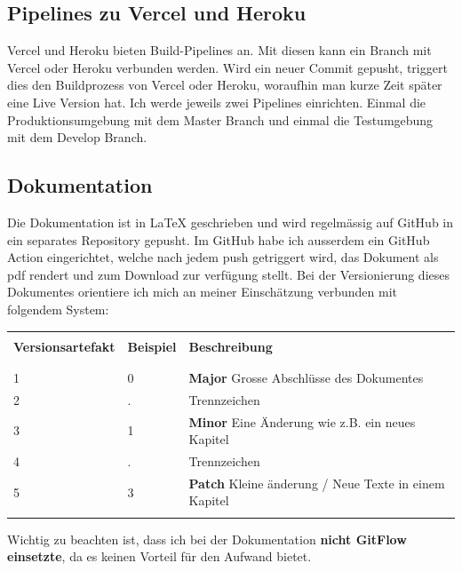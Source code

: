 \subsection{Pipelines zu Vercel und Heroku}
Vercel und Heroku bieten Build-Pipelines an. Mit diesen kann ein Branch mit Vercel oder Heroku verbunden werden. Wird ein neuer Commit gepusht, triggert dies den Buildprozess von Vercel oder Heroku, woraufhin man kurze Zeit später eine Live Version hat.
\newline
\newline
Ich werde jeweils zwei Pipelines einrichten. Einmal die Produktionsumgebung mit dem Master Branch und einmal die Testumgebung mit dem Develop Branch.
\subsection{Dokumentation}
Die Dokumentation ist in LaTeX geschrieben und wird regelmässig auf GitHub in ein separates Repository gepusht. Im GitHub habe ich ausserdem ein GitHub Action eingerichtet, welche nach jedem push getriggert wird, das Dokument als pdf rendert und zum Download zur verfügung stellt.
\newline
\newline
Bei der Versionierung dieses Dokumentes orientiere ich mich an meiner Einschätzung verbunden mit folgendem System:
\begin{table}[htp]
  \begin{tabularx}{\textwidth}{l l X}\hline \\
  \textbf{Versionsartefakt} & \textbf{Beispiel} & \textbf{Beschreibung} \\ \\\hline \\
  1 & 0 & \textbf{Major} Grosse Abschlüsse des Dokumentes \\
  2 & . & Trennzeichen \\
  3 & 1 & \textbf{Minor} Eine Änderung wie z.B. ein neues Kapitel \\
  4 & . & Trennzeichen \\
  5 & 3 & \textbf{Patch} Kleine änderung / Neue Texte in einem Kapitel \\
  \\\hline
  \end{tabularx}
\end{table}
\newline
Wichtig zu beachten ist, dass ich bei der Dokumentation \textbf{nicht GitFlow einsetzte}, da es keinen Vorteil für den Aufwand bietet.
